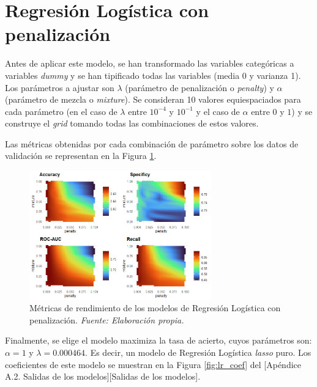 \documentclass[12pt,a4paper,]{book}
\newcounter{dummy}
\numberwithin{dummy}{section}
\theoremstyle{ocrenumbox}
\theoremstyle{blacknumex}
\theoremstyle{blacknumbox}
\theoremstyle{ocrenum}
\theoremstyle{ocrenum}
\begin{document}
\hypertarget{regresiuxf3n-loguxedstica-con-penalizaciuxf3n}{%
\section{Regresión Logística con
penalización}\label{regresiuxf3n-loguxedstica-con-penalizaciuxf3n}}

Antes de aplicar este modelo, se han transformado las variables
categóricas a variables \emph{dummy} y se han tipificado todas las
variables (media 0 y varianza 1). Los parámetros a ajustar son
\(\lambda\) (parámetro de penalización o \emph{penalty}) y \(\alpha\)
(parámetro de mezcla o \emph{mixture}). Se consideran 10 valores
equiespaciados para cada parámetro (en el caso de \(\lambda\) entre
\(10^{-4}\) y \(10^{-1}\) y el caso de \(\alpha\) entre \(0\) y \(1\)) y
se construye el \emph{grid} tomando todas las combinaciones de estos
valores.

Las métricas obtenidas por cada combinación de parámetro sobre los datos
de validación se representan en la Figura \ref{fig:lr_tuningplot}.

\begin{figure}[h!]
\centering
\includegraphics[width =0.7\textwidth]{graficos/lr_tuningplot.png}
\caption[Métricas de rendimiento de los modelos de Regresión Logística con penalización]{Métricas de rendimiento de los modelos de Regresión Logística con penalización.  \it Fuente: Elaboración propia.}
\label{fig:lr_tuningplot}
\end{figure}

Finalmente, se elige el modelo maximiza la tasa de acierto, cuyos
parámetros son: \(\alpha= 1\) y \(\lambda = 0.000464\). Es decir, un
modelo de Regresión Logística \emph{lasso} puro. Los coeficientes de
este modelo se muestran en la Figura \ref{fig:lr_coef} del {[}Apéndice
A.2. Salidas de los modelos{]}{[}Salidas de los modelos{]}.
\end{document}

